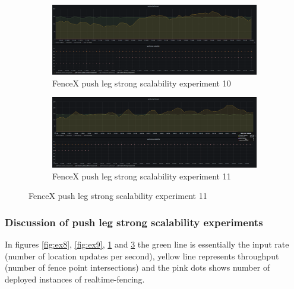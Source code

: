\documentclass[a4]{report}
\begin{document}
    \begin{figure}
        \centering
        \begin{subfigure}[b]{\textwidth}
            \centering
            \caption{FenceX push leg strong scalability experiment 10}
            \label{fig:ex10}
            \includegraphics[width=\textwidth, height=0.35\textheight, scale=2]{images/evaluation/ex10-benchmarking-ongoing-2per4sec.png}
        \end{subfigure}

        \begin{subfigure}[b]{\textwidth}
            \centering
            \caption{FenceX push leg strong scalability experiment 11}
            \label{fig:ex11}
            \includegraphics[width=\textwidth, height=0.35\textheight, scale=2]{images/evaluation/ex11-benchmarking-ongoing-2per4sec.png}
        \end{subfigure}
    \end{figure}

    \clearpage

    \subsubsection{Discussion of push leg strong scalability experiments}
    In figures \ref{fig:ex8}, \ref{fig:ex9},  \ref{fig:ex10} and  \ref{fig:ex11} the green line is essentially the
    input rate (number of location updates per second), yellow line represents throughput (number of fence point
    intersections) and the pink dots shows number of deployed instances of realtime-fencing.
\end{document}
